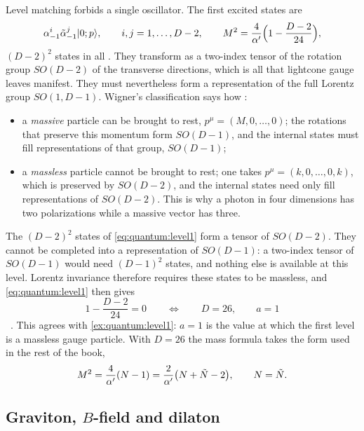 Level matching forbids a single oscillator. The first excited states are
\begin{equation}\label{eq:quantum:level1}
 \alpha^i_{-1}\tilde\alpha^j_{-1}|0;p\rangle,\qquad i,j=1,\dots,D-2,\qquad
 M^2=\frac4{\alpha'}\Big(1-\frac{D-2}{24}\Big),
\end{equation}
$(D-2)^2$ states in all . They transform as a two-index
tensor of the rotation group $SO(D-2)$ of the transverse directions, which is all that
lightcone gauge leaves manifest. They must nevertheless form a representation of the full
Lorentz group $SO(1,D-1)$. Wigner's classification says how
:
\begin{itemize}[leftmargin=*]
\item a \emph{massive} particle can be brought to rest, $p^\mu=(M,0,\dots,0)$; the rotations
that preserve this momentum form $SO(D-1)$, and the internal states must fill
representations of that group, $SO(D-1)$;
\item a \emph{massless} particle cannot be brought to rest; one takes $p^\mu=(k,0,\dots,0,k)$,
which is preserved by $SO(D-2)$, and the internal states need only fill representations of
$SO(D-2)$. This is why a photon in four dimensions has two polarizations while a massive
vector has three.
\end{itemize}
The $(D-2)^2$ states of \cref{eq:quantum:level1} form a tensor of $SO(D-2)$. They cannot be
completed into a representation of $SO(D-1)$: a two-index tensor of $SO(D-1)$ would need
$(D-1)^2$ states, and nothing else is available at this level. Lorentz invariance therefore
requires these states to be massless, and \cref{eq:quantum:level1} then gives
\begin{equation}\label{eq:quantum:D26}
 1-\frac{D-2}{24}=0\qquad\Longleftrightarrow\qquad D=26,\qquad a=1
\end{equation}
\TL\ . This agrees with
\cref{ex:quantum:level1}: $a=1$ is the value at which the first level is a massless gauge
particle. With $D=26$ the mass formula takes the form used in the rest of the book,
\begin{equation}\label{eq:quantum:massfinal}
 M^2=\frac4{\alpha'}(N-1)=\frac{2}{\alpha'}\big(N+\tilde N-2\big),\qquad N=\tilde N .
\end{equation}

\subsection{Graviton, \texorpdfstring{$B$}{B}-field and dilaton}

